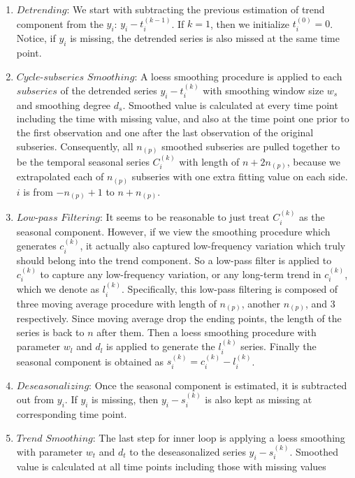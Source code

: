 \begin{enumerate}
  \item $Detrending$:
  We start with subtracting the previous estimation of trend component from the
  $y_i$: $y_i - t_i^{(k-1)}$. If $k=1$, then we initialize $t_i^{(0)}=0$. Notice,
  if $y_i$ is missing, the detrended series is also missed at the same time point.
  \item $Cycle$-$subseries$ $Smoothing$:
  A loess smoothing procedure is applied to each $subseries$ of the detrended 
  series $y_i - t_i^{(k)}$ with smoothing window size $w_s$ and smoothing degree
  $d_s$. Smoothed value is calculated at every time point including the time with
  missing value, and also at the time point one prior to the first observation
  and one after the last observation of the original subseries. Consequently,
  all $n_{(p)}$ smoothed subseries are pulled together to be the 
  temporal seasonal series $C_i^{(k)}$ with length of $n + 2n_{(p)}$, because we
  extrapolated each of $n_{(p)}$ subseries with one extra fitting value on each 
  side. $i$ is from $-n_{(p)} + 1$ to $n + n_{(p)}$.  
  \item $Low$-$pass$ $Filtering$:
  It seems to be reasonable to just treat $C_i^{(k)}$ as the seasonal component.
  However, if we view the smoothing procedure which generates $c_i^{(k)}$, it
  actually also captured low-frequency variation which truly should belong into 
  the trend component. So a low-pass filter is applied to $c_i^{(k)}$ to capture 
  any low-frequency variation, or any long-term trend in $c_i^{(k)}$, which we 
  denote as $l_i^{(k)}$. Specifically, this low-pass filtering is composed of 
  three moving average procedure with length of $n_{(p)}$, another $n_{(p)}$, and 
  3 respectively. Since moving average drop the ending points, the length of the 
  series is back to $n$ after them. Then a loess smoothing procedure with parameter 
  $w_l$ and $d_l$ is applied to generate the $l_i^{(k)}$ series. Finally the 
  seasonal component is obtained as $s_i^{(k)} = c_i^{(k)} - l_i^{(k)}$.  
  \item $Deseasonalizing$:
  Once the seasonal component is estimated, it is subtracted out from $y_i$. If
  $y_i$ is missing, then $y_i - s_i^{(k)}$ is also kept as missing at corresponding
  time point.
  \item $Trend$ $Smoothing$:
  The last step for inner loop is applying a loess smoothing with parameter $w_t$
  and $d_t$ to the deseasonalized series $y_i - s_i^{(k)}$. Smoothed value is 
  calculated at all time points including those with missing values 
\end{enumerate}

